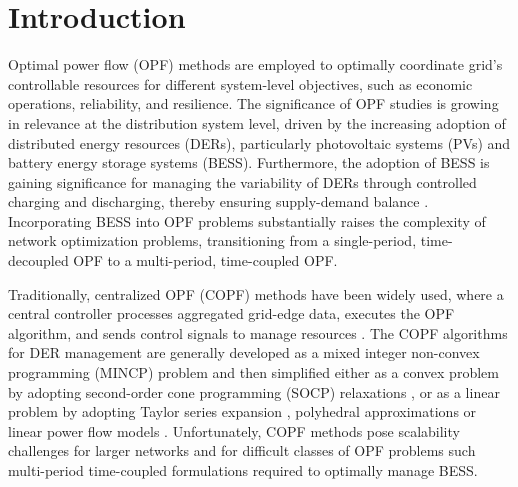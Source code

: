 \documentclass{article}
\begin{document}
\section{Introduction}

Optimal power flow (OPF) methods are employed to optimally coordinate grid's controllable resources for different system-level objectives, such as economic operations, reliability, and resilience. The significance of OPF studies is growing in relevance at the distribution system level, driven by the increasing adoption of distributed energy resources (DERs), particularly photovoltaic systems (PVs) and battery energy storage systems (BESS). Furthermore, the adoption of BESS is gaining significance for managing the variability of DERs through controlled charging and discharging, thereby ensuring supply-demand balance \cite{tgangwar}. Incorporating BESS into OPF problems substantially raises the complexity of network optimization problems, transitioning from a single-period, time-decoupled OPF to a multi-period, time-coupled OPF.

Traditionally, centralized OPF (COPF) methods have been widely used, where a central controller processes aggregated grid-edge data, executes the OPF algorithm, and sends control signals to manage resources \cite{spaul}. The COPF algorithms for DER management are generally developed as a mixed integer non-convex programming (MINCP) problem and then simplified either as a convex problem by adopting second-order cone programming (SOCP) relaxations \cite{Wei} \cite{Chowdhury}, or as a linear problem by adopting Taylor series expansion \cite{spaul}, polyhedral approximations \cite{Guo} or linear power flow models \cite{Yuan}. Unfortunately, COPF methods pose scalability challenges for larger networks and for difficult classes of OPF problems such multi-period time-coupled formulations required to optimally manage BESS. 

\end{document}
